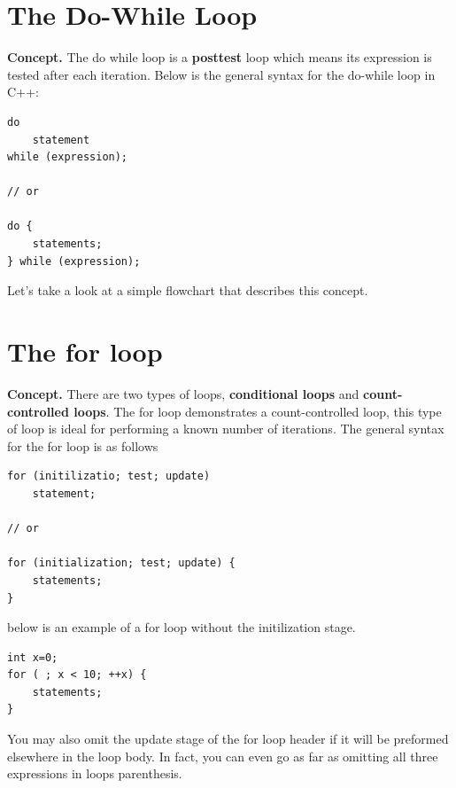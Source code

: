 \documentclass{report}
\begin{document}
    \pagebreak \bigbreak \noindent 
    \section{\LARGE The Do-While Loop}
    \bigbreak \noindent 
    \textbf{Concept.} The do while loop is a \textbf{posttest} loop which means its expression is tested after each iteration. Below is the general syntax for the do-while loop in C++:
    \bigbreak \noindent 
    \sepline
    \begin{verbatim}
do 
    statement
while (expression);

// or 

do {
    statements;
} while (expression);
    \end{verbatim}
    \sepline
    \bigbreak \noindent 
    \begin{minipage}[]{0.47\textwidth}
        Let's take a look at a simple flowchart that describes this concept.
    
    \end{minipage}
    \begin{minipage}[]{0.47\textwidth}
    \end{minipage}

    \pagebreak \bigbreak \noindent 
    \section{\LARGE The for loop}
    \bigbreak \noindent 
    \textbf{Concept.} There are two types of loops, \textbf{conditional loops} and \textbf{count-controlled loops}. The for loop demonstrates a count-controlled loop, this type of loop is ideal for performing a known number of iterations.
    \bigbreak \noindent 
    The general syntax for the for loop is as follows
    \bigbreak \noindent 
    \sepline
    \begin{verbatim}
for (initilizatio; test; update)  
    statement;

// or

for (initialization; test; update) { 
    statements;
}
    \end{verbatim}
    \sepline

    \bigbreak \noindent 
    \bigbreak \noindent 
    below is an example of a for loop without the initilization stage.
    \bigbreak \noindent 
    \sepline
    \begin{verbatim}
int x=0;
for ( ; x < 10; ++x) {
    statements;
}

    \end{verbatim}
    \sepline
    \bigbreak \noindent 
    You may also omit the update stage of the for loop header if it will be preformed elsewhere in the loop body. In fact, you can even go as far as omitting all three expressions in loops parenthesis.
\end{document}
